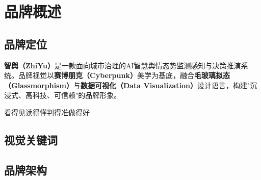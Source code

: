 
\section{品牌概述}

\subsection{品牌定位}

\textbf{智舆（ZhiYu）}是一款面向城市治理的AI智慧舆情态势监测感知与决策推演系统。品牌视觉以\textbf{赛博朋克（Cyberpunk）}美学为基底，融合\textbf{毛玻璃拟态（Glassmorphism）}与\textbf{数据可视化（Data Visualization）}设计语言，构建"沉浸式、高科技、可信赖"的品牌形象。

\begin{specbox}[品牌核心价值]
\centering
\vspace{4pt}
{\heiti\sanhao\color{CyberCyan} 看得见\quad\textcolor{NeonPurple}{\textbullet}\quad 读得懂\quad\textcolor{NeonPurple}{\textbullet}\quad 判得准\quad\textcolor{NeonPurple}{\textbullet}\quad 做得好}
\vspace{4pt}
\end{specbox}

\subsection{视觉关键词}

\begin{center}
\end{center}

\subsection{品牌架构}

